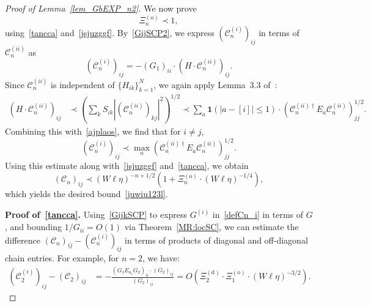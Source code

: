 \documentclass[10pt,reqno]{article}
\theoremstyle{plain} %
\theoremstyle{remark}
\numberwithin{equation}{section}
\begin{document}
\begin{proof}[Proof of Lemma~\ref{lem_GbEXP_n2}]
We now  prove
\begin{equation}\label{juwiu123l}
    \Xi^{(\mathrm{o})}_n \prec 1,
\end{equation}
using~\eqref{tancca} and~\eqref{jsjuzggf}. By~\eqref{GijSCP2}, we express \( \left( \mathcal{C}_n^{(i)} \right)_{ij} \) in terms of \( \mathcal{C}_n^{(ii)} \) as
\begin{equation}\label{ajplaos}
\left( \mathcal{C}_n^{(i)} \right)_{ij} = -(G_1)_{ii} \cdot \left( H \cdot \mathcal{C}_n^{(ii)} \right)_{ij}.
\end{equation}
Since \( \mathcal{C}_n^{(ii)} \) is independent of \( \{ H_{ik} \}_{k=1}^N \), we again apply Lemma~3.3 of~\cite{erdHos2012rigidity}:
\begin{align}\label{lkjdsaos}
\left( H \cdot \mathcal{C}_n^{(ii)} \right)_{ij}
&\prec \left( \sum_k S_{ik} \left| \left( \mathcal{C}_n^{(ii)} \right)_{kj} \right|^2 \right)^{1/2}
\prec \sum_a \mathbf{1}(|a - [i]| \le 1) \cdot \left( \mathcal{C}_n^{(ii)\dagger} E_a \mathcal{C}_n^{(ii)} \right)_{jj}^{1/2}.
\end{align}
Combining this with~\eqref{ajplaos}, we find that for \( i \ne j \),
\begin{equation}\label{bCimmax}
\left( \mathcal{C}_n^{(i)} \right)_{ij} \prec \max_a \left( \mathcal{C}_n^{(ii)\dagger} E_a \mathcal{C}_n^{(ii)} \right)_{jj}^{1/2}.
\end{equation}
Using this estimate along with~\eqref{jsjuzggf} and~\eqref{tancca}, we obtain
\[
\left( \mathcal{C}_n \right)_{ij} \prec (W \ell \eta)^{-n + 1/2} \left( 1 + \Xi_n^{(\mathrm{o})} \cdot (W \ell \eta)^{-1/4} \right),
\]
which yields the desired bound~\eqref{juwiu123l}.


  
 
 
  
  
 

\medskip
\noindent
\textbf{Proof of~\eqref{tancca}.} Using~\eqref{GijkSCP} to express \( G^{(i)} \) in~\eqref{defCn_i} in terms of \( G \), and bounding \( 1/G_{ii} = O(1) \) via Theorem~\ref{MR:locSC}, we can estimate the difference \( \left( \mathcal{C}_n \right)_{ij} - \left( \mathcal{C}^{(i)}_n \right)_{ij} \) in terms of products of diagonal and off-diagonal chain entries. For example, for \( n = 2 \), we have:
\begin{align}
\left( \mathcal{C}^{(i)}_2 \right)_{ij} - \left( \mathcal{C}_2 \right)_{ij}
&= -\frac{\left( G_1 E_{a_1} G_2 \right)_{ii} \cdot (G_2)_{ij}}{(G_2)_{ii}} 
= O\left( \Xi^{(\mathrm{d})}_2 \cdot \Xi^{(\mathrm{o})}_1 \cdot (W \ell \eta)^{-3/2} \right).
\end{align}


\end{proof}
\end{document}

